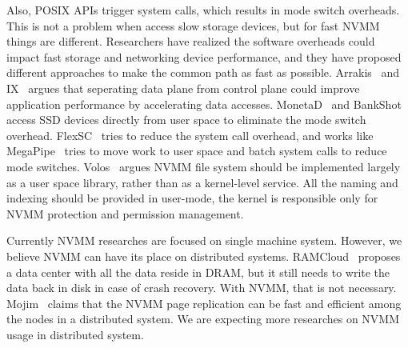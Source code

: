 Also, POSIX APIs trigger system calls, which results in mode switch overheads.
This is not a problem when access slow storage devices, but for fast NVMM things
are different.
Researchers have realized the software overheads could impact
fast storage and networking device performance,
and they have proposed different approaches to make the common path as fast
as possible.
Arrakis~\cite{Arrakis} and IX~\cite{IX} argues that seperating data plane
from control plane could improve application performance by accelerating
data accesses. MonetaD~\cite{monetad} and BankShot~\cite{BankShot} access
SSD devices directly from user space to eliminate the mode switch overhead.
FlexSC~\cite{FlexSC} tries to reduce the system call overhead,
and works like MegaPipe~\cite{MegaPipe} tries to move work to user space and
batch system calls to reduce mode switches. Volos~\cite{system-scm} argues
NVMM file system should be implemented largely as a user space library, rather
than as a kernel-level service. All the naming and indexing should be provided
in user-mode, the kernel is responsible only for NVMM protection and permission
management.

Currently NVMM researches are focused on single machine system. However,
we believe NVMM can have its place on distributed systems.
RAMCloud~\cite{RAMCloud} proposes a data center with all the data reside in DRAM, but it still needs to write the data back in disk in case of crash recovery.
With NVMM, that is not necessary. Mojim~\cite{mojim} claims that the NVMM page
replication can be fast and efficient among the nodes in a distributed system.
We are expecting more researches on NVMM usage in distributed system.

